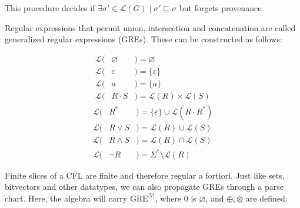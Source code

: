 \documentclass[portrait,a0b,final,a4resizeable]{a0poster}
\def\jointspacing{\vspace{0.3in}}
\begin{document}
\begin{poster}
\begin{multicols}{2}
      \null\hspace*{3cm}\begin{minipage}[c]{0.90\columnwidth}
      This procedure decides if $\exists \sigma' \in \mathcal{L}(G) \mid \sigma' \sqsubseteq \sigma$ but forgets provenance.
\vspace{1cm}
      \end{minipage}
      \jointspacing

\pagebreak
      \jointspacing

      \hspace*{2cm}\begin{minipage}[c]{0.90\columnwidth}
Regular expressions that permit union, intersection and concatenation are called generalized regular expressions (GREs). These can be constructed as follows:
\end{minipage}

\vspace{-2cm}
\setlength{\columnseprule}{0pt}
\setlength{\columnsep}{-3cm}
\begin{multicols}{2}
\begin{eqnarray*}
\mathcal{L}(& \varnothing & ) = \varnothing \\
\mathcal{L}(& \varepsilon & ) = \{\varepsilon\} \\
\mathcal{L}(& a           & ) = \{a\}\\
\mathcal{L}(& R\cdot S    & ) = \mathcal{L}(R) \times \mathcal{L}(S)
\end{eqnarray*} \break\vspace{-0.45cm}
\begin{eqnarray*}
\mathcal{L}(& R^*         & ) = \{\varepsilon\} \cup \mathcal{L}(R\cdot R^*)\\
\mathcal{L}(& R\vee S     & ) = \mathcal{L}(R) \cup \mathcal{L}(S)\\
\mathcal{L}(& R\land S    & ) = \mathcal{L}(R) \cap \mathcal{L}(S)\\
\mathcal{L}(& \neg R      & ) = \Sigma^* \setminus \mathcal{L}(R)
\end{eqnarray*}
\end{multicols}

\jointspacing

\hspace*{2cm}\begin{minipage}[c]{0.90\columnwidth}
Finite slices of a CFL are finite and therefore regular a fortiori. Just like sets, bitvectors and other datatypes, we can also propagate GREs through a parse chart. Here, the algebra will carry $\text{GRE}^{|V|}$, where 0 is $\varnothing$, and $\oplus, \otimes$ are defined:
\end{minipage}


\end{multicols}
\end{poster}
\end{document}
